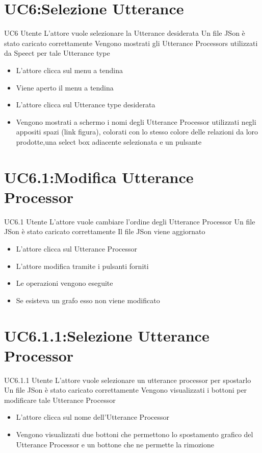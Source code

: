 \documentclass[../AnalisideiRequisiti.tex]{subfiles}
\begin{document}
\section{UC6:Selezione Utterance}
\UserCase
{UC6}
{Utente}
{}
{L'attore vuole selezionare la Utterance desiderata}
{Un file JSon è stato caricato  correttamente }
{Vengono mostrati gli Utterance Processors utilizzati da Speect per tale Utterance type}
{}
{
	\begin{itemize}
		\item{} L'attore clicca sul menu a tendina
		\item{} Viene aperto il menu a tendina
		\item{} L'attore clicca sul Utterance type desiderata
		\item{} Vengono mostrati a schermo i nomi degli Utterance Processor utilizzati negli appositi spazi (link figura), colorati con lo stesso colore delle relazioni da loro prodotte,una select box adiacente selezionata e un pulsante
		
	\end{itemize}
}
\section{UC6.1:Modifica Utterance Processor}
\UserCase
{UC6.1}
{Utente}
{}
{L'attore vuole cambiare l'ordine degli Utterance Processor}
{Un file JSon è stato caricato  correttamente }
{Il file JSon viene aggiornato}
{}
{
	\begin{itemize}
		\item{} L'attore clicca sul Utterance Processor 
		\item{} L'attore modifica tramite i pulsanti forniti	
		\item{} Le operazioni vengono eseguite
		\item{} Se esisteva un grafo esso non viene modificato
		
	\end{itemize}
}
\section{UC6.1.1:Selezione Utterance Processor}
\UserCase
{UC6.1.1}
{Utente}
{}
{L'attore vuole selezionare un utterance processor per spostarlo}
{Un file JSon è stato caricato  correttamente }
{Vengono visualizzati i bottoni per modificare tale Utterance Processor}
{}
{
	\begin{itemize}
		\item{} L'attore clicca sul nome dell'Utterance Processor
		\item{} Vengono visualizzati due bottoni che permettono lo spostamento grafico del Utterance Processor e un bottone che ne permette la rimozione 
		
		
	\end{itemize}
}
\end{document}
